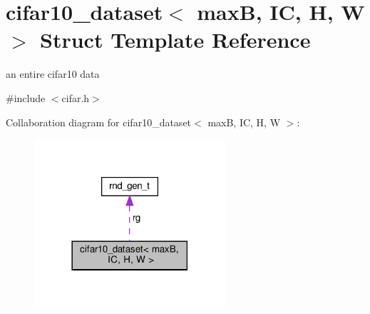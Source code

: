 \hypertarget{structcifar10__dataset}{}\section{cifar10\+\_\+dataset$<$ maxB, IC, H, W $>$ Struct Template Reference}
\label{structcifar10__dataset}


an entire cifar10 data  




{\ttfamily \#include $<$cifar.\+h$>$}



Collaboration diagram for cifar10\+\_\+dataset$<$ maxB, IC, H, W $>$\+:\nopagebreak
\begin{figure}[H]
\begin{center}
\leavevmode
\includegraphics[width=201pt]{structcifar10__dataset__coll__graph}
\end{center}
\end{figure}
